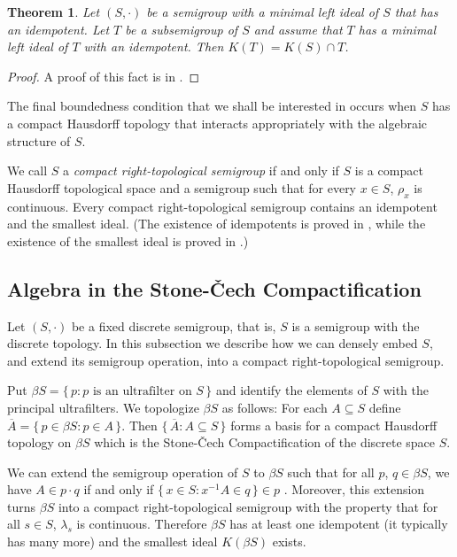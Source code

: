 \documentclass[12pt,showtrims]{memoir}
\theoremstyle{plain}
\newtheorem{thm}{Theorem}[section]
\theoremstyle{definition}
\begin{document}
\begin{thm}
  Let $(S, \cdot)$ be a semigroup with a minimal left ideal of $S$ that has an idempotent. 
  Let $T$ be a subsemigroup of $S$ and assume that $T$ has a minimal left ideal of $T$ with an idempotent.
  Then $K(T) = K(S) \cap T$.
\end{thm}
\begin{proof}
  A proof of this fact is in \cite[Theorem 1.65]{Hindman:1998fk}.
\end{proof}

The final boundedness condition that we shall be interested in occurs when $S$ has a compact Hausdorff topology that interacts appropriately with the algebraic structure of $S$.

We call $S$ a \emph{compact right-topological semigroup} if and only if $S$ is a compact Hausdorff topological space and a semigroup such that for every $x \in S$, $\rho_x$ is continuous. 
Every compact right-topological semigroup contains an idempotent and the smallest ideal.
(The existence of idempotents is proved in \cite[Theorem 2.5]{Hindman:1998fk}, while the existence of the smallest ideal is proved in \cite[Theorem 2.8]{Hindman:1998fk}.)

\subsection{Algebra in the Stone-\v{C}ech Compactification}
Let $(S, \cdot)$ be a fixed discrete semigroup, that is, $S$ is a semigroup with the discrete topology. 
In this subsection we describe how we can densely embed $S$, and extend its semigroup operation, into a compact right-topological semigroup.

Put $\beta S = \{\, p : \mbox{$p$ is an ultrafilter on $S$} \,\}$ and identify the elements of $S$ with the principal ultrafilters.
We topologize $\beta S$ as follows: For each $A \subseteq S$ define $\overline{A} = \{\, p \in \beta S : p \in A \,\}$.
Then $\{\, \overline{A} : A \subseteq S \,\}$ forms a basis for a compact Hausdorff topology on $\beta S$ which is the Stone-\v{C}ech Compactification \cite[Theorem 3.27]{Hindman:1998fk} of the discrete space $S$.

We can extend the semigroup operation of $S$ to $\beta S$ \cite[Theorem 4.1]{Hindman:1998fk} such that for all $p$, $q \in \beta S$, we have $A \in p \cdot q$ if and only if $\{\, x \in S : x^{-1}A \in q \,\} \in p$ \cite[Theorem 4.12(b)]{Hindman:1998fk}.
Moreover, this extension turns $\beta S$ into a compact right-topological semigroup with the property that for all $s \in S$, $\lambda_s$ is continuous. 
Therefore $\beta S$ has at least one idempotent (it typically has many more) and the smallest ideal $K(\beta S)$ exists. 
\end{document}
